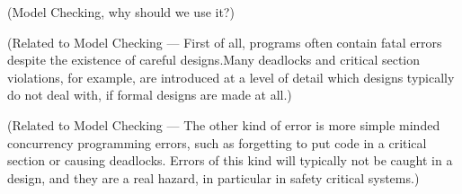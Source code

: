 \label{sec:formal-methods}

(Model Checking, why should we use it?)

(Related to Model Checking --- First of all, programs often contain fatal errors despite the existence of careful designs.Many deadlocks and critical section violations, for example, are introduced at a level of detail which designs typically do not deal with, if formal designs are made at all.)

(Related to Model Checking --- The other kind of error is more simple minded concurrency programming errors, such as forgetting to put code in a critical section or causing deadlocks. Errors of this kind will typically not be caught in a design, and they are a real hazard, in particular in safety critical systems.)